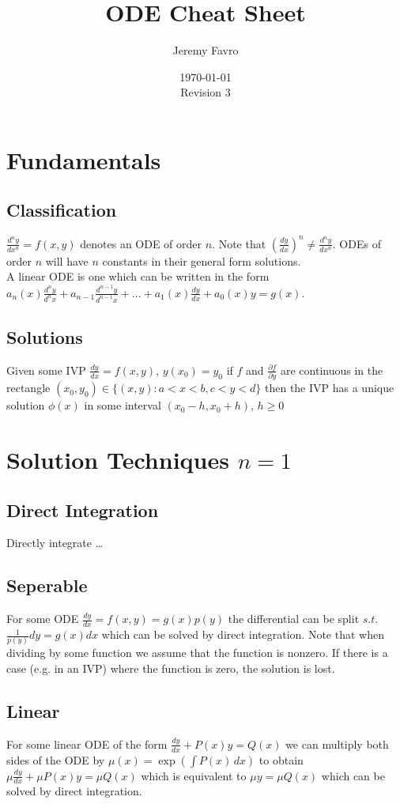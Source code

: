 \documentclass[10pt,landscape,letterpaper]{cheatsheet}
\title{ODE Cheat Sheet}
\author{Jeremy Favro}
\date{\today\\Revision 3}
\begin{document}
\maketitle

\section*{Fundamentals}
\subsection*{Classification}
$\frac{d^ny}{dx^n}=f(x,y)$ denotes an ODE of order $n$. Note that $(\frac{dy}{dx})^n\neq\frac{d^ny}{dx^n}$. ODEs of order $n$ will have $n$ constants in their general form solutions.\\
A linear ODE is one which can be written in the form $a_n(x)\frac{d^ny}{d^nx}+a_{n-1}\frac{d^{n-1}y}{d^{n-1}x}+\dots+a_1(x)\frac{dy}{dx}+a_0(x)y=g(x)$.\\
\subsection*{Solutions}
Given some IVP $\frac{dy}{dx}=f(x,y), \, y(x_0)=y_0$ if $f$ and $\frac{\partial f}{\partial y}$ are continuous in the rectangle $(x_0,y_0)\in \{(x,y):a<x<b,c<y<d\}$ then the
IVP has a unique solution $\phi(x)$ in some interval $(x_0-h,x_0+h), \, h\geq 0$


\section*{Solution Techniques $n=1$}
\subsection*{Direct Integration}
Directly integrate \dots
\subsection*{Seperable}
For some ODE $\frac{dy}{dx}=f(x,y)=g(x)p(y)$ the differential can be split $s.t.$ $\frac{1}{p(y)}dy=g(x)dx$ which can be solved by direct integration.
Note that when dividing by some function we assume that the function is nonzero. If there is a case (e.g. in an IVP) where the function is zero, the solution
is lost.
\subsection*{Linear}
For some linear ODE of the form $\frac{dy}{dx}+P(x)y=Q(x)$ we can multiply both sides of the ODE by $\mu(x)=\exp\left(\int P(x)\, dx\right)$
to obtain $\mu\frac{dy}{dx}+\mu P(x)y= \mu Q(x)$ which is equivalent to $\mu y=\mu Q(x)$ which can be solved by direct integration.
\end{document}
